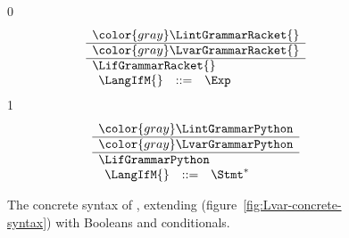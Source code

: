 \documentclass[7x10]{TimesAPriori_MIT}%
\newcommand{\gray}[1]{{\color{gray} #1}}
\def\racketEd{0}
\def\pythonEd{1}
\providecommand{\BookEdition}{1}
\let\edition\BookEdition
\newcommand{\pythonColor}[0]{}
\numberwithin{theorem}{chapter}
\numberwithin{definition}{chapter}
\numberwithin{equation}{chapter}
\begin{document}
\begin{figure}[tp]
\centering
\begin{tcolorbox}[colback=white]
{\if\edition\racketEd    
\[
\begin{array}{l}
  \gray{\LintGrammarRacket{}} \\ \hline
  \gray{\LvarGrammarRacket{}} \\ \hline
  \LifGrammarRacket{} \\ 
  \begin{array}{lcl}
    \LangIfM{} &::=& \Exp
  \end{array}
\end{array}
\]
\fi}
{\if\edition\pythonEd\pythonColor
\[
\begin{array}{l}
  \gray{\LintGrammarPython} \\ \hline
  \gray{\LvarGrammarPython}  \\ \hline
  \LifGrammarPython \\  
\begin{array}{rcl}
  \LangIfM{} &::=& \Stmt^{*}
\end{array}
\end{array}
\]
\fi}
\end{tcolorbox}
\caption{The concrete syntax of \LangIf{}, extending \LangVar{}
  (figure~\ref{fig:Lvar-concrete-syntax}) with Booleans and conditionals.}
\label{fig:Lif-concrete-syntax}
\end{figure}
\end{document}
